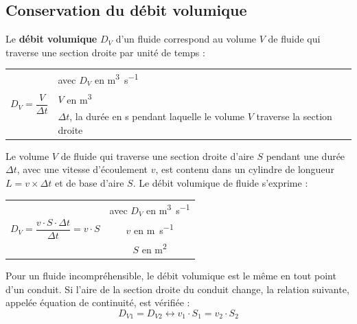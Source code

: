 \documentclass[a4paper,11pt,fleqn]{scrartcl}%
\begin{document}
    \subsection{Conservation du débit volumique}
    Le \textbf{débit volumique} $D_V$ d'un fluide correspond au volume $V$ de fluide qui traverse une section droite par unité de temps :
    \begin{center}
        \begin{tabular}{c|m{7cm}}
        \multirow{3}{*}{$D_V=\dfrac{V}{\Delta t}$} & avec $D_V$ en \unit{\meter\cubed\per\second}\\
        &$V$ en \unit{\meter\cubed}\\
        &$\Delta t$, la durée en \unit{\second} pendant laquelle le volume $V$ traverse la section droite\\
    \end{tabular}
    \end{center}
    Le volume $V$ de fluide qui traverse une section droite d'aire $S$ pendant une durée $\Delta t$, avec une vitesse d'écoulement $v$, est contenu dans un cylindre de longueur $L=v\times \Delta t$ et de base d'aire $S$. Le débit volumique de fluide s'exprime :
    \begin{center}
        \begin{tabular}{c|c}
        \multirow{3}{*}{$D_V = \dfrac{v\cdot S\cdot \Delta t}{\Delta t} = v\cdot S$} & avec $D_V$ en \unit{\meter\cubed\per\second}\\
        &$v$ en \unit{\meter\per\second}\\
        &$S$ en \unit{\meter\squared}\\
    \end{tabular}
    \end{center}
    Pour un fluide incompréhensible, le débit volumique est le même en tout point d'un conduit. Si l'aire de la section droite du conduit change, la relation suivante, appelée équation de continuité, est vérifiée : $$D_{V1} = D_{V2} \leftrightarrow v_1 \cdot S_1 = v_2 \cdot S_2$$
\end{document}
